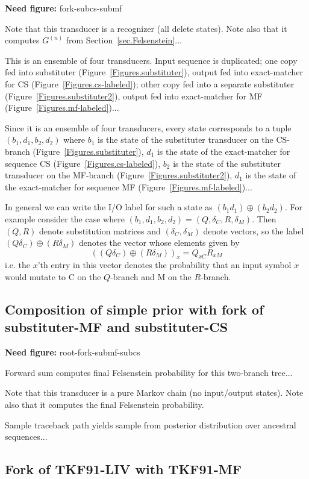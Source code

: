 \documentclass{article}
\newcommand{\secref}[1]{Section~\ref{sec.#1}}
\newcommand{\figref}[1]{Figure~\ref{Figures.#1}}
\newcommand{\needfig}[1]{{\bf Need figure: } #1 }
\begin{document}
\needfig{fork-subcs-submf}

Note that this transducer is a recognizer (all delete states).
Note also that it computes $G^{(n)}$ from \secref{Felsenstein}...

This is an ensemble of four transducers.
Input sequence is duplicated;
one copy fed into substituter (\figref{substituter}),
output fed into exact-matcher for CS (\figref{cs-labeled});
other copy fed into a separate substituter (\figref{substituter2}),
output fed into exact-matcher for MF (\figref{mf-labeled})...

Since it is an ensemble of four transducers, every state corresponds to a tuple $(b_1,d_1,b_2,d_2)$
where
$b_1$ is the state of the substituter transducer on the CS-branch (\figref{substituter}),
$d_1$ is the state of the exact-matcher for sequence CS (\figref{cs-labeled}),
$b_2$ is the state of the substituter transducer on the MF-branch (\figref{substituter2}),
$d_1$ is the state of the exact-matcher for sequence MF (\figref{mf-labeled})...

In general we can write the I/O label for such a state as $(b_1 d_1) \oplus (b_2 d_2)$.
For example consider the case where $(b_1,d_1,b_2,d_2) = (Q,\delta_C,R,\delta_M)$.
Then $(Q,R)$ denote substitution matrices
and $(\delta_C,\delta_M)$ denote vectors,
so the label $(Q \delta_C) \oplus (R \delta_M)$
denotes the vector whose elements given by
\[
\left( (Q \delta_C) \oplus (R \delta_M) \right)_x
= Q_{xC} R_{xM}
\]
i.e. the $x$'th entry in this vector denotes the probability that an input symbol $x$
would mutate to C on the $Q$-branch and M on the $R$-branch.

\subsection{Composition of simple prior with fork of substituter-MF and substituter-CS}

\needfig{root-fork-submf-subcs}

Forward sum computes final Felsenstein probability for this two-branch tree...

Note that this transducer is a pure Markov chain (no input/output states).
Note also that it computes the final Felsenstein probability.

Sample traceback path yields sample from posterior distribution over ancestral sequences...

\subsection{Fork of TKF91-LIV with TKF91-MF}
\end{document}
